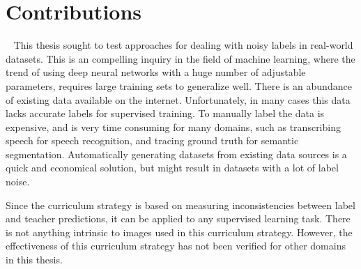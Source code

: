 \section{Contributions}~\label{cont}
\label{sec:Contributions}
This thesis sought to test approaches for dealing with noisy labels in real-world datasets. This is an compelling inquiry in the field of machine learning, where the trend of using deep neural networks with a huge number of adjustable parameters, requires large training sets to generalize well. There is an abundance of existing data available on the internet. Unfortunately, in many cases this data lacks accurate labels for supervised training. To manually label the data is expensive, and is very time consuming for many domains, such as transcribing speech for speech recognition, and tracing ground truth for semantic segmentation. Automatically generating datasets from existing data sources is a quick and economical solution, but might result in datasets with a lot of label noise.\\


Since the curriculum  strategy is based on measuring inconsistencies between label and teacher predictions, it can be applied to any supervised learning task. There is not anything intrinsic to images used in this curriculum strategy. However, the effectiveness of this curriculum strategy has not been verified for other domains in this thesis.\\
